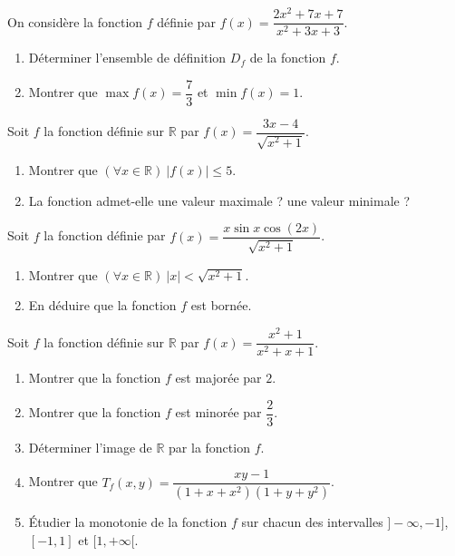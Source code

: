 On considère la fonction $f$ définie par $f(x)=\dfrac{2x^2+7x+7}{x^2+3x+3}$.
\begin{enumerate}
\item Déterminer l'ensemble de définition $D_f$ de la fonction $f$.
\item Montrer que $\max f(x)=\dfrac73$ et $\min f(x)=1$.
\end{enumerate}
\fin
{}
Soit $f$ la fonction définie sur $\mathbb{R}$ par $f(x)=\dfrac{3x-4}{\sqrt{x^2+1}}$.
\begin{enumerate}
\item Montrer que $(\forall x\in\mathbb{R})\ |f(x)|\leq5$.
\item La fonction admet-elle une valeur maximale ? une valeur minimale ?
\end{enumerate}
\fin
{}
Soit $f$ la fonction définie par $f(x)=\dfrac{x\sin x\cos(2x)}{\sqrt{x^2+1}}$.
\begin{enumerate}
\item Montrer que $(\forall x\in\mathbb{R})\ |x|<\sqrt{x^2+1}$.
\item En déduire que la fonction $f$ est bornée.
\end{enumerate}
\fin
{}
Soit $f$ la fonction définie sur $\mathbb{R}$ par $f(x)=\dfrac{x^2+1}{x^2+x+1}$.
\begin{enumerate}
\item Montrer que la fonction $f$ est majorée par $2$.
\item Montrer que la fonction $f$ est minorée par $\dfrac23$.
\item Déterminer l'image de $\mathbb{R}$ par la fonction $f$.
\item Montrer que $T_f(x,y)=\dfrac{xy-1}{\left(1+x+x^2\right)\left(1+y+y^2\right)}$.
\item Étudier la monotonie de la fonction $f$ sur chacun des intervalles $]-\infty,-1]$, $[-1,1]$ et $[1,+\infty[$.
\end{enumerate}
\fin
